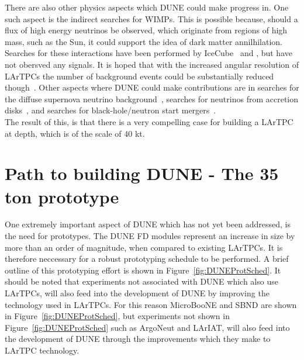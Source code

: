 There are also other physics aspects which DUNE could make progress in. One such aspect is the indirect searches for WIMPs. This is possible because, should a flux of high energy neutrinos be observed, which originate from regions of high mass, such as the Sun, it could support the idea of dark matter annilhilation. Searches for these interactions have been performed by IceCube~\citep{Aartsen:2012kia} and \citep{Choi:2015ara}, but have not obersved any signals. It is hoped that with the increased angular resolution of LArTPCs the number of background events could be substantially reduced though~\citep{DUNECDR_V2}. Other aspects where DUNE could make contributions are in searches for the diffuse supernova neutrino background~\citep{Beacom:2010kk}, searches for neutrinos from accretion disks~\citep{Caballero:2011dw}, and searches for black-hole/neutron start mergers~\citep{Caballero:2009ww}. \\

The result of this, is that there is a very compelling case for building a LArTPC at depth, which is of the scale of 40 kt.\\

\section{Path to building DUNE - The 35 ton prototype} \label{sec:The35tonDetector}  %
One extremely important aspect of DUNE which has not yet been addressed, is the need for prototypes. The DUNE FD modules represent an increase in size by more than an order of magnitude, when compared to existing LArTPCs. It is therefore neccessary for a robust prototyping schedule to be performed. A brief outline of this prototyping effort is shown in Figure~\ref{fig:DUNEProtSched}. It should be noted that experiments not associated with DUNE which also use LArTPCs, will also feed into the development of DUNE by improving the technology used in LArTPCs. For this reason MicroBooNE and SBND are shown in Figure~\ref{fig:DUNEProtSched}, but experiments not shown in Figure~\ref{fig:DUNEProtSched} such as ArgoNeut and LArIAT, will also feed into the development of DUNE through the improvements which they make to LArTPC technology. \\

